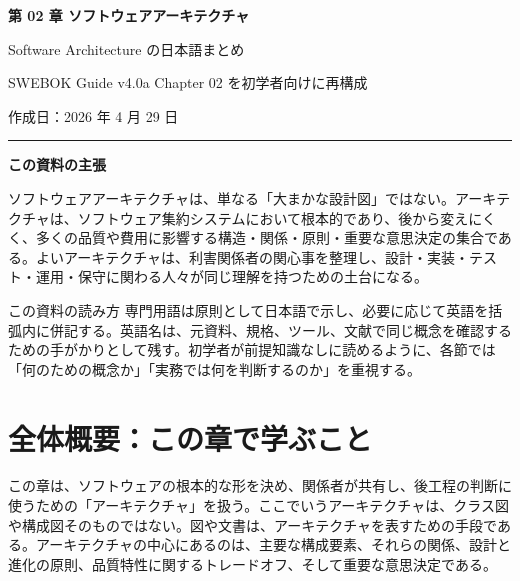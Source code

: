 \documentclass[a4paper,11pt]{ltjsarticle}
\begin{document}
\thispagestyle{plain}
\begin{center}
{\Large\bfseries 第 02 章 ソフトウェアアーキテクチャ}\par\vspace{1em}
{\large Software Architecture の日本語まとめ}\par\vspace{0.7em}
{SWEBOK Guide v4.0a Chapter 02 を初学者向けに再構成}\par\vspace{1.2em}
{作成日：2026 年 4 月 29 日}\par
\end{center}
\vspace{1em}
\hrule
\vspace{0.7em}

\noindent\textbf{この資料の主張}\par
ソフトウェアアーキテクチャは、単なる「大まかな設計図」ではない。アーキテクチャは、ソフトウェア集約システムにおいて根本的であり、後から変えにくく、多くの品質や費用に影響する構造・関係・原則・重要な意思決定の集合である。よいアーキテクチャは、利害関係者の関心事を整理し、設計・実装・テスト・運用・保守に関わる人々が同じ理解を持つための土台になる。

\begin{statementbox}{この資料の読み方}
専門用語は原則として日本語で示し、必要に応じて英語を括弧内に併記する。英語名は、元資料、規格、ツール、文献で同じ概念を確認するための手がかりとして残す。初学者が前提知識なしに読めるように、各節では「何のための概念か」「実務では何を判断するのか」を重視する。
\end{statementbox}

\tableofcontents
\clearpage

\section*{全体概要：この章で学ぶこと}
この章は、ソフトウェアの根本的な形を決め、関係者が共有し、後工程の判断に使うための「アーキテクチャ」を扱う。ここでいうアーキテクチャは、クラス図や構成図そのものではない。図や文書は、アーキテクチャを表すための手段である。アーキテクチャの中心にあるのは、主要な構成要素、それらの関係、設計と進化の原則、品質特性に関するトレードオフ、そして重要な意思決定である。
\end{document}
